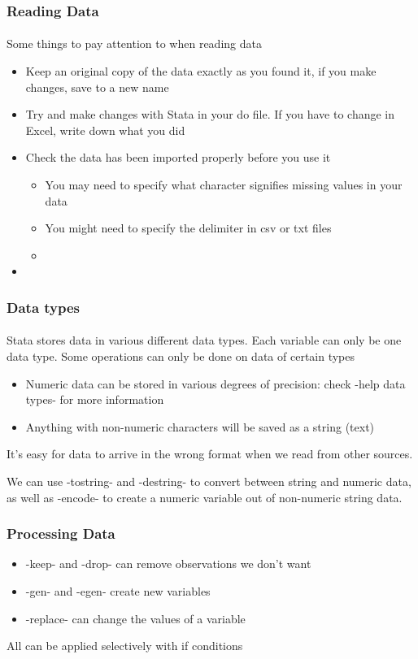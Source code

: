 \documentclass{beamer}
\begin{document}
\begin{frame}
  \frametitle{Reading Data}
  \framesubtitle{}
Some things to pay attention to when reading data
  \begin{itemize}
    \item Keep an original copy of the data exactly as you found it, if you make changes, save to a new name
    \item Try and make changes with Stata in your do file. If you have to change in Excel, write down what you did
    \item Check the data has been imported properly before you use it
	\begin{itemize}
	    \item You may need to specify what character signifies missing values in your data 
	    \item You might need to specify the delimiter in csv or txt files
	    \item 
	\end{itemize}
    \item 

  \end{itemize}
\end{frame}

\begin{frame}
  \frametitle{Data types}
  \framesubtitle{}
Stata stores data in various different data types. Each variable can only be one data type. Some operations can only be done on data of certain types
  \begin{itemize}
    \item Numeric data can be stored in various degrees of precision: check -help data types- for more information
    \item Anything with non-numeric characters will be saved as a string (text)
  \end{itemize}

It's easy for data to arrive in the wrong format when we read from other sources.


We can use -tostring- and -destring- to convert between string and numeric data, as well as -encode- to create a numeric variable out of non-numeric string data.
\end{frame}

\begin{frame}[fragile]
  \frametitle{Processing Data}
  \begin{itemize}
    \item -keep- and -drop- can remove observations we don't want
    \item -gen- and -egen- create new variables
    \item -replace- can change the values of a variable
  \end{itemize}
All can be applied selectively with if conditions

\end{frame}
\end{document}
